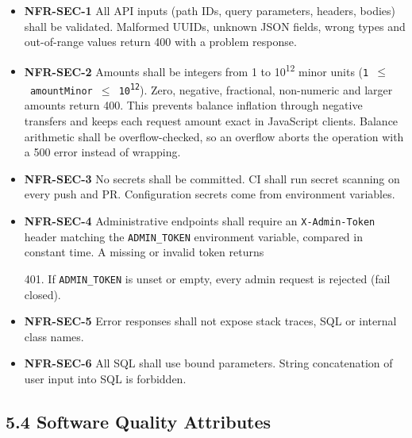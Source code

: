 \documentclass[11pt,a4paper]{article}
\providecommand{\tightlist}{\setlength{\itemsep}{2pt}\setlength{\parskip}{0pt}}
\begin{document}
\begin{itemize}
\tightlist
\item
  \textbf{NFR-SEC-1} All API inputs (path IDs, query parameters, headers, bodies) shall be validated.
  Malformed UUIDs, unknown JSON fields, wrong types and out-of-range values return 400 with a
  problem response.
\item
  \textbf{NFR-SEC-2} Amounts shall be integers from 1 to 10\textsuperscript{12} minor units (\texttt{1\ \ensuremath{\le}\ amountMinor\ \ensuremath{\le}\ 10\textsuperscript{12}}).
  Zero, negative, fractional, non-numeric and larger amounts return 400. This prevents balance
  inflation through negative transfers and keeps each request amount exact in JavaScript clients.
  Balance arithmetic shall be overflow-checked, so an overflow aborts the operation with a 500
  error instead of wrapping.
\item
  \textbf{NFR-SEC-3} No secrets shall be committed. CI shall run secret scanning on every push and PR.
  Configuration secrets come from environment variables.
\item
  \textbf{NFR-SEC-4} Administrative endpoints shall require an \texttt{X-Admin-Token} header matching the
  \texttt{ADMIN\_\allowbreak{}TOKEN} environment variable, compared in constant time. A missing or invalid token returns

  401. If \texttt{ADMIN\_\allowbreak{}TOKEN} is unset or empty, every admin request is rejected (fail closed).
\item
  \textbf{NFR-SEC-5} Error responses shall not expose stack traces, SQL or internal class names.
\item
  \textbf{NFR-SEC-6} All SQL shall use bound parameters. String concatenation of user input into SQL is
  forbidden.
\end{itemize}

\subsection{5.4 Software Quality Attributes}\label{software-quality-attributes}
\end{document}
